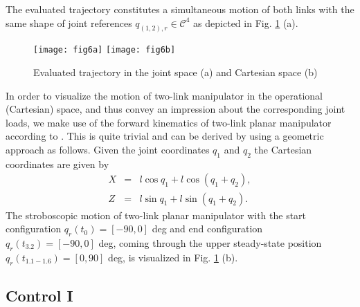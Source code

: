 \documentclass[a4paper, 10pt, conference]{ieeeconf}
\begin{document}
The evaluated trajectory constitutes a simultaneous motion of both
links with the same shape of joint references $q_{(1,2),r} \in
\mathcal{C}^4$ as depicted in Fig. \ref{fig:traject} (a).
\begin{figure}[!h]
\centering
\texttt{[image: fig6a]}
\texttt{[image: fig6b]}
\caption{Evaluated trajectory in the joint space (a) and Cartesian
space (b)} \label{fig:traject}
\end{figure}
In order to visualize the motion of two-link manipulator in the
operational (Cartesian) space, and thus convey an impression about
the corresponding joint loads, we make use of the forward
kinematics of two-link planar manipulator according to
\cite{spong2006}. This is quite trivial and can be derived by
using a geometric approach as follows. Given the joint coordinates
$q_{1}$ and $q_{2}$ the Cartesian coordinates are given by
\begin{eqnarray}\label{eq:15a}
X &=& l \cos q_{1} + l \cos(q_{1} + q_{2}), \\
  Z &=& l \sin q_{1} + l \sin(q_{1} + q_{2}).
  \label{eq:15b}
\end{eqnarray}
The stroboscopic motion of two-link planar manipulator with the
start configuration $q_{r}(t_0) = [-90, 0]$ deg and end
configuration $q_{r}(t_{3.2}) = [-90, 0]$ deg, coming through the
upper steady-state position $q_{r}(t_{1.1-1.6}) = [0, 90]$ deg, is
visualized in Fig. \ref{fig:traject} (b).




\subsection*{Control I} \label{sec:6:1}
\end{document}
